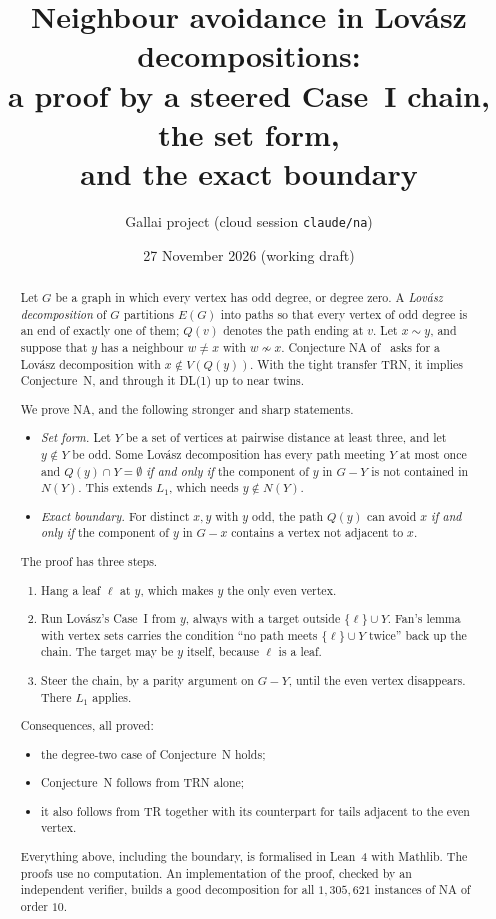 \documentclass[11pt]{amsart}
\title[Neighbour avoidance]{Neighbour avoidance in Lov\'asz decompositions:\\
a proof by a steered Case~I chain, the set form,\\ and the exact boundary}
\author{Gallai project (cloud session \texttt{claude/na})}
\date{27 November 2026 (working draft)}
\theoremstyle{definition}
\begin{document}
\begin{abstract}
Let $G$ be a graph in which every vertex has odd degree, or degree zero. A \emph{Lov\'asz
decomposition} of $G$ partitions $E(G)$ into paths so that every vertex of odd degree is an end of
exactly one of them; $Q(v)$ denotes the path ending at $v$. Let $x\sim y$, and suppose that $y$ has
a neighbour $w\ne x$ with $w\not\sim x$. Conjecture NA of~\cite{CN} asks for a Lov\'asz decomposition
with $x\notin V(Q(y))$. With the tight transfer TRN, it implies Conjecture~N, and through
it DL(1) up to near twins.

We prove NA, and the following stronger and sharp statements.
\begin{itemize}
\item \emph{Set form.} Let $Y$ be a set of vertices at pairwise distance at least three, and let
$y\notin Y$ be odd. Some Lov\'asz decomposition has every path meeting $Y$ at most once and
$Q(y)\cap Y=\emptyset$ \emph{if and only if} the component of $y$ in $G-Y$ is not contained in $N(Y)$.
This extends $L_1$, which needs $y\notin N(Y)$.
\item \emph{Exact boundary.} For distinct $x,y$ with $y$ odd, the path $Q(y)$ can avoid $x$ \emph{if
and only if} the component of $y$ in $G-x$ contains a vertex not adjacent to $x$.
\end{itemize}

The proof has three steps.
\begin{enumerate}
\item Hang a leaf $\ell$ at $y$, which makes $y$ the only even vertex.
\item Run Lov\'asz's Case~I from $y$, always with a target outside $\{\ell\}\cup Y$. Fan's lemma with
vertex sets carries the condition ``no path meets $\{\ell\}\cup Y$ twice'' back up the chain. The
target may be $y$ itself, because $\ell$ is a leaf.
\item Steer the chain, by a parity argument on $G-Y$, until the even vertex disappears. There $L_1$
applies.
\end{enumerate}

Consequences, all proved:
\begin{itemize}
\item the degree-two case of Conjecture~N holds;
\item Conjecture~N follows from TRN alone;
\item it also follows from TR together with its counterpart for tails adjacent to the even vertex.
\end{itemize}
Everything above, including the boundary, is formalised in Lean~4 with Mathlib. The proofs use no
computation. An
implementation of the proof, checked by an independent verifier, builds a good decomposition for all
$1{,}305{,}621$ instances of NA of order $10$.
\end{abstract}
\maketitle
\end{document}
